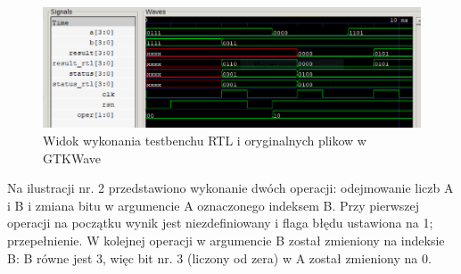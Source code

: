 \begin{figure}[h!]
	\centering
	\includegraphics[width=1\linewidth]{img1}
	\caption{Widok wykonania testbenchu RTL i oryginalnych plikow w GTKWave}
	\label{fig:img1}
\end{figure}

\noindent
Na ilustracji nr. 2 przedstawiono wykonanie dwóch operacji: odejmowanie liczb A i B i zmiana bitu w argumencie A oznaczonego indeksem B. Przy pierwszej operacji na początku wynik jest niezdefiniowany i flaga błędu ustawiona na 1; przepełnienie. W kolejnej operacji w argumencie B został zmieniony na indeksie B: B równe jest 3, więc bit nr. 3 (liczony od zera) w A został zmieniony na 0.